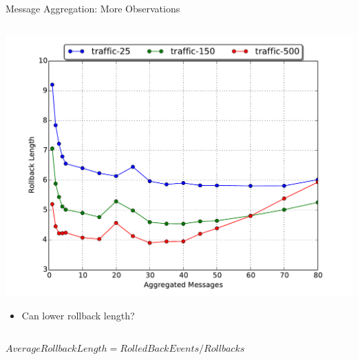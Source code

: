 \documentclass[10pt]{beamer}
\begin{document}
\begin{frame}{Message Aggregation: More Observations}
\begin{columns}
    \begin{column}[t]{0.55\textwidth}
        \includegraphics[width=\textwidth]{../figs/partitioning_communication/aggregate_traffic_rblength.pdf}
        \vspace*{-\bigskipamount}
        \begin{small}
        \begin{itemize}
            \item Can lower rollback length?
        \end{itemize}
        \end{small}
    \end{column}

    \end{columns}

    \bigskip
    \bigskip

    $AverageRollbackLength = RolledBackEvents/Rollbacks$

\end{frame}
\end{document}
